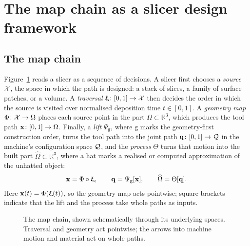 \section{The map chain as a slicer design framework}
\label{main:chain}

\subsection{The map chain}
Figure~\ref{fig:main-chain} reads a slicer as a sequence of decisions. A slicer first chooses a \emph{source} $\mathcal{X}$, the space in which the path is designed: a stack of slices, a family of surface patches, or a volume. A \emph{traversal} ${\bm{\mathrm{\upxi}}}\colon[0,1]\to\mathcal{X}$ then decides the order in which the source is visited over normalised deposition time $t\in[0,1]$. A \emph{geometry map} $\Phi\colon\mathcal{X}\to\Omega$ places each source point in the part $\Omega\subset\mathbb R^3$, which produces the tool path ${\bm{\mathrm{x}}}\colon[0,1]\to\Omega$. Finally, a \emph{lift} $\Psi_{\mathrm{g}}$, where $\mathrm{g}$ marks the geometry-first construction order, turns the tool path into the joint path ${\bm{\mathrm{q}}}\colon[0,1]\to\mathcal{Q}$ in the machine's configuration space $\mathcal{Q}$, and the \emph{process} $\Theta$ turns that motion into the built part $\widehat\Omega\subset\mathbb R^3$, where a hat marks a realised or computed approximation of the unhatted object:
\begin{equation}
  \label{eq:main-chain}
  {\bm{\mathrm{x}}}=\Phi\circ{\bm{\mathrm{\upxi}}},\qquad {\bm{\mathrm{q}}}=\Psi_{\mathrm{g}}[{\bm{\mathrm{x}}}],\qquad
  \widehat\Omega=\Theta[{\bm{\mathrm{q}}}].
\end{equation}
Here ${\bm{\mathrm{x}}}(t)=\Phi({\bm{\mathrm{\upxi}}}(t))$, so the geometry map acts pointwise; square brackets indicate that the lift and the process take whole paths as inputs.

\begin{figure}[htbp]
  \centering
  \caption{The map chain, shown schematically through its underlying spaces. Traversal and geometry act pointwise; the arrows into machine motion and material act on whole paths.}
  \label{fig:main-chain}
\end{figure}

